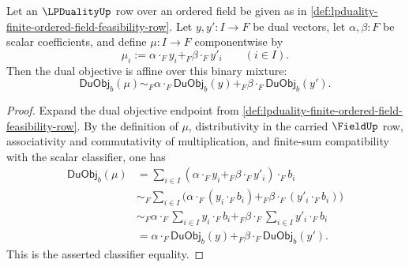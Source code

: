 \begin{lemma}
\label{lem:lpduality-dual-objective-binary-affine-readback}
Let an $\LPDualityUp$ row over an ordered field be given as in \autoref{def:lpduality-finite-ordered-field-feasibility-row}. Let $y,y':I\to F$ be dual vectors, let $\alpha,\beta:F$ be scalar coefficients, and define $\mu:I\to F$ componentwise by
$$
\mu_i:=\alpha\cdot_F y_i+_F\beta\cdot_F y'_i
\qquad (i\in I).
$$
Then the dual objective is affine over this binary mixture:
$$
\mathsf{DuObj}_{b}(\mu)
\sim_F
\alpha\cdot_F\mathsf{DuObj}_{b}(y)+_F
\beta\cdot_F\mathsf{DuObj}_{b}(y').
$$
\end{lemma}
\begin{proof}
Expand the dual objective endpoint from \autoref{def:lpduality-finite-ordered-field-feasibility-row}. By the definition of $\mu$, distributivity in the carried $\FieldUp$ row, associativity and commutativity of multiplication, and finite-sum compatibility with the scalar classifier, one has
$$
\begin{aligned}
\mathsf{DuObj}_{b}(\mu)
&=\sum_{i\in I}(\alpha\cdot_F y_i+_F\beta\cdot_F y'_i)\cdot_F b_i\\
&\sim_F
\sum_{i\in I}\bigl(\alpha\cdot_F(y_i\cdot_F b_i)+_F
\beta\cdot_F(y'_i\cdot_F b_i)\bigr)\\
&\sim_F
\alpha\cdot_F\sum_{i\in I}y_i\cdot_F b_i
+_F
\beta\cdot_F\sum_{i\in I}y'_i\cdot_F b_i\\
&=
\alpha\cdot_F\mathsf{DuObj}_{b}(y)+_F
\beta\cdot_F\mathsf{DuObj}_{b}(y').
\end{aligned}
$$
This is the asserted classifier equality.
\end{proof}

